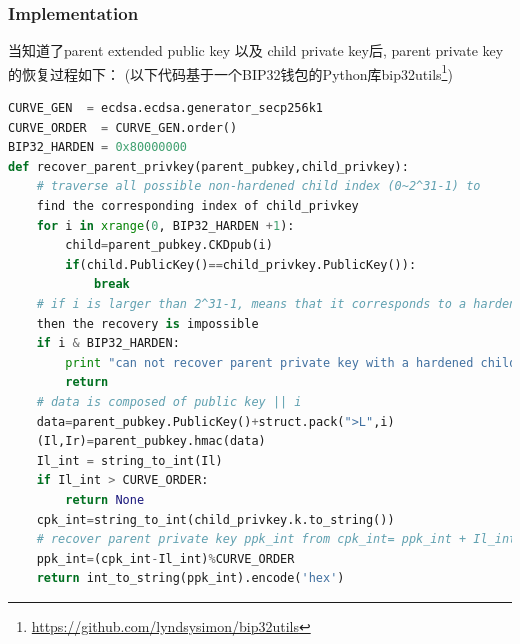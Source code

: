 \subsubsection{Implementation}
当知道了parent extended public key 以及 child private key后,
parent private key的恢复过程如下：
(以下代码基于一个BIP32钱包的Python库bip32utils\footnote{\url{https://github.com/lyndsysimon/bip32utils}})

\begin{lstlisting}[language=python,label=lst-recover]
CURVE_GEN  = ecdsa.ecdsa.generator_secp256k1
CURVE_ORDER  = CURVE_GEN.order()
BIP32_HARDEN = 0x80000000 
def recover_parent_privkey(parent_pubkey,child_privkey):
	# traverse all possible non-hardened child index (0~2^31-1) to 
	find the corresponding index of child_privkey
	for i in xrange(0, BIP32_HARDEN +1):
		child=parent_pubkey.CKDpub(i)
		if(child.PublicKey()==child_privkey.PublicKey()):
			break
    # if i is larger than 2^31-1, means that it corresponds to a hardened child, 
    then the recovery is impossible
	if i & BIP32_HARDEN:
		print "can not recover parent private key with a hardened child node"
		return
	# data is composed of public key || i
	data=parent_pubkey.PublicKey()+struct.pack(">L",i)
	(Il,Ir)=parent_pubkey.hmac(data)
	Il_int = string_to_int(Il)
	if Il_int > CURVE_ORDER:
	    return None
	cpk_int=string_to_int(child_privkey.k.to_string())
	# recover parent private key ppk_int from cpk_int= ppk_int + Il_int mod n
	ppk_int=(cpk_int-Il_int)%CURVE_ORDER
	return int_to_string(ppk_int).encode('hex')
\end{lstlisting}


